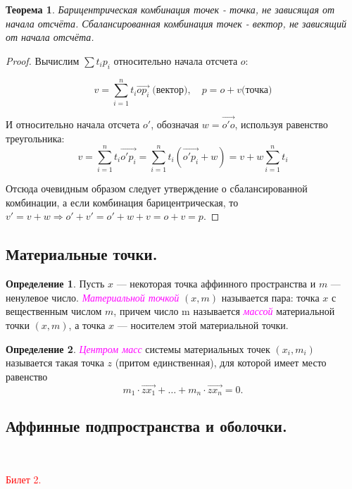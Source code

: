 \documentclass[a4paper,100pt]{article}
\theoremstyle{indented}
\newtheorem{theorem}{Теорема}
\theoremstyle{definition}
\newtheorem{defn}{Определение}
\theoremstyle{remark}
\begin{document}
\begin{theorem}
    Барицентрическая комбинация точек - точка, не зависящая от начала отсчёта. Сбалансированная комбинация точек - вектор, не зависящий от начала отсчёта.
\end{theorem}

\begin{proof}
    Вычислим $\sum t_ip_i$ относительно начала отсчета $o$:

    $$v = \sum\limits_{i=1}^n t_i\overrightarrow{op_i}\; \text{(вектор)}, \quad p = o + v\text{(точка)}$$

    И относительно начала отсчета $o'$, обозначая $w=\overrightarrow{o'o}$, используя равенство треугольника:
    $$v = \sum\limits_{i=1}^n t_i\overrightarrow{o'p_i}=\sum\limits_{i=1}^n t_i(\overrightarrow{o'p_i}+w) = v + w\sum\limits_{i=1}^n t_i $$

    Отсюда очевидным образом следует утверждение о сбалансированной комбинации, а если комбинация барицентрическая, то $v' = v+w \Rightarrow o'+v' = o'+w+v = o + v = p$.
\end{proof}

\subsection{Материальные точки.}

\begin{defn}
    Пусть $x$ — некоторая точка аффинного пространства и $m$ — ненулевое число. \textit{\textcolor{magenta}{\hypertarget{s10}{Материальной точкой}}} $(x,m)$ называется пара: точка $x$ с вещественным числом $m$, причем число m называется \textit{\textcolor{magenta}{\hypertarget{s11}{массой}}} материальной точки $(x,m)$, а точка $x$ — носителем этой материальной точки.
\end{defn}

\begin{defn}
    \textit{\textcolor{magenta}{\hypertarget{s12}{Центром масс}}} системы материальных точек $(x_i, m_i)$ называется такая точка $z$ (притом единственная), для которой имеет место равенство
    \[
        m_1 \cdot \vec{zx_1} + \ldots + m_n \cdot \vec{zx_n} = 0. 
    \]
\end{defn}

\subsection{Аффинные подпространства и оболочки.} \

\textcolor{red}{\hypertarget{b2}{Билет 2.}}
\end{document}

